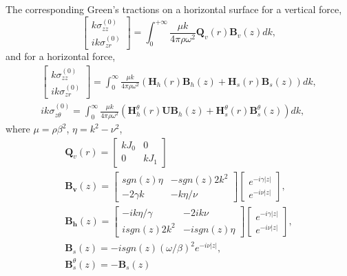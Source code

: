 \documentclass[preprint,5p,times]{elsarticle}
\begin{document}
The corresponding Green's tractions on a horizontal surface for a vertical force,
\begin{equation}
\left[\begin{matrix} k \sigma_{zz}^{(0)} \\
ik \sigma_{zr}^{(0)} \end{matrix} \right] = \int_{0}^{+ \infty} \frac{\mu k}{4 \pi \rho \omega^2} \boldsymbol{Q}_v(r) \boldsymbol{B}_v(z) dk,
\label{Tij0_k_ver}
\end{equation}
and for a horizontal force,
\begin{equation}
\begin{aligned}
\left[\begin{matrix} k \sigma_{zz}^{(0)} \\
ik \sigma_{zr}^{(0)} \end{matrix} \right] = \int_{0}^{\infty}\frac{\mu k}{4 \pi \rho \omega^2} \left(\boldsymbol{H}_h(r) \boldsymbol{B}_h(z) + \boldsymbol{H}_s(r) \boldsymbol{B}_s(z)\right) dk, \\
ik \sigma_{z \theta}^{(0)} = \int_{0}^{\infty}\frac{\mu k}{4 \pi \rho \omega^2} \left(\boldsymbol{H}_h^\theta(r) \boldsymbol{U} \boldsymbol{B}_h(z) + \boldsymbol{H}_s^\theta(r) \boldsymbol{B}_s^\theta(z)\right) dk,
\end{aligned}
\label{Tij0_k_hor}
\end{equation}
where $\mu = \rho \beta^2$, $\eta = k^2-\nu^2$,
\begin{equation}
\begin{aligned}
\boldsymbol{Q}_v(r) = \left[\begin{matrix}
k J_0 & 0 \\ 0 & k J_1
\end{matrix}\right] \\
\boldsymbol{B_v}(z) = \left[\begin{matrix}
sgn(z) \eta & -sgn(z)2k^2 \\ -2\gamma k & -k \eta / \nu 
\end{matrix} \right] \left[\begin{matrix}
e^{-i \gamma |z|} \\ e^{-i \nu |z|}
\end{matrix} \right],\\
\boldsymbol{B_h}(z) = \left[\begin{matrix}
-ik\eta /\gamma & -2ik\nu \\ i sgn(z)2k^2 & -i sgn(z)\eta 
\end{matrix} \right] \left[\begin{matrix}
e^{-i \gamma |z|} \\ e^{-i \nu |z|}
\end{matrix} \right],\\
\boldsymbol{B}_s(z) = -i sgn(z) (\omega / \beta)^2 e^{-i \nu |z|},\\
\boldsymbol{B}_s^\theta(z) = - \boldsymbol{B}_s(z)
\end{aligned}
\end{equation}
\end{document}
